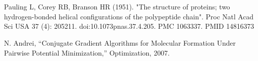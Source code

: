 \section{}

\section{}



\begin{thebibliography}{99}

Pauling L, Corey RB, Branson HR (1951). "The structure of proteins; 
two hydrogen-bonded helical configurations of the polypeptide chain". Proc Natl Acad Sci USA 37 (4): 205211. 
doi:10.1073\/pnas.37.4.205. PMC 1063337. PMID 14816373

N. Andrei, “Conjugate Gradient Algorithms for Molecular Formation Under
Pairwise Potential Minimization,” Optimization, 2007.


\end{thebibliography}

